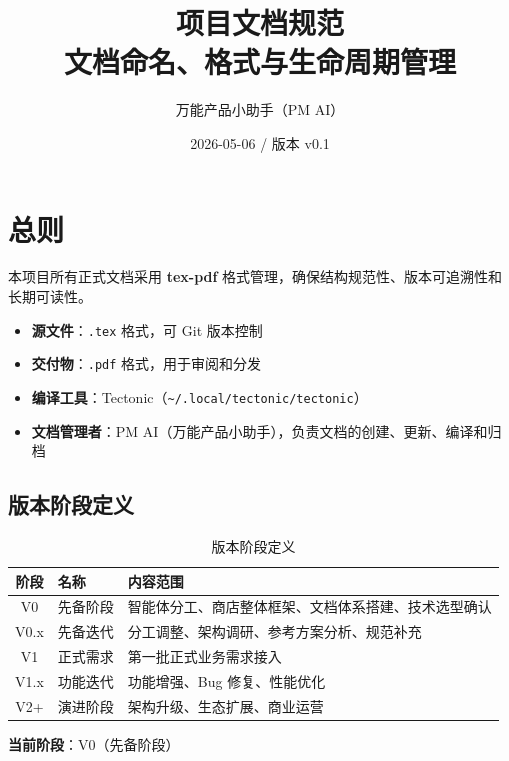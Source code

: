 \documentclass[11pt,a4paper]{article}
\title{\textbf{项目文档规范}\\[0.5em]\small 文档命名、格式与生命周期管理}
\author{万能产品小助手（PM AI）}
\date{2026-05-06 / 版本 v0.1}
\begin{document}
\maketitle

\tableofcontents
\newpage

\section{总则}

本项目所有正式文档采用 \textbf{tex-pdf} 格式管理，确保结构规范性、版本可追溯性和长期可读性。

\begin{itemize}
  \item \textbf{源文件}：\texttt{.tex} 格式，可 Git 版本控制
  \item \textbf{交付物}：\texttt{.pdf} 格式，用于审阅和分发
  \item \textbf{编译工具}：Tectonic（\texttt{\textasciitilde/.local/tectonic/tectonic}）
  \item \textbf{文档管理者}：PM AI（万能产品小助手），负责文档的创建、更新、编译和归档
\end{itemize}

\subsection{版本阶段定义}

\begin{table}[h]
\centering
\begin{tabular}{clp{7cm}}
\toprule
\textbf{阶段} & \textbf{名称} & \textbf{内容范围} \\
\midrule
V0 & 先备阶段 & 智能体分工、商店整体框架、文档体系搭建、技术选型确认 \\
V0.x & 先备迭代 & 分工调整、架构调研、参考方案分析、规范补充 \\
V1 & 正式需求 & 第一批正式业务需求接入 \\
V1.x & 功能迭代 & 功能增强、Bug 修复、性能优化 \\
V2+ & 演进阶段 & 架构升级、生态扩展、商业运营 \\
\bottomrule
\end{tabular}
\caption{版本阶段定义}
\end{table}

\textbf{当前阶段}：V0（先备阶段）

\end{document}
